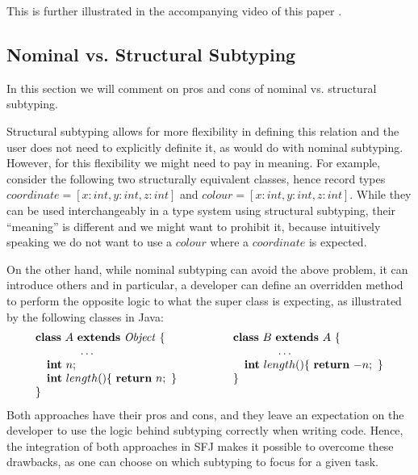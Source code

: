 \documentclass[runningheads]{llncs}
\begin{document}
This is further illustrated in the accompanying video of this paper \cite{UD20}.

\subsection{Nominal vs. Structural Subtyping}
\label{sec:nominal}
In this section we will comment on pros and cons of nominal vs. structural subtyping.

Structural subtyping allows for more flexibility in defining this relation and the user does not need to explicitly definite it, as would do with nominal subtyping.
However, for this flexibility we might need to pay in meaning.
For example, consider the following two structurally equivalent classes, hence record types
$coordinate = [x:int, y:int, z:int]$ and $colour = [x:int, y:int, z:int]$.
While they can be used interchangeably in a type system using structural subtyping, their ``meaning'' is different and we might want to prohibit it, because intuitively speaking we do not want to use a $colour$ where a $coordinate$ is expected.

On the other hand, while nominal subtyping can avoid the above problem, it can introduce others and in particular, a developer can define an overridden method to perform the opposite logic to what the super class is expecting, as illustrated by the following classes in Java:
\begin{equation*}
    \begin{array}{ll}
        \mathbf{class} \  A \ \mathbf{extends }\  \mathit{Object}\ \{
         &
            \qquad
            \mathbf{class} \  B \ \mathbf{extends }\  A\ \{
                \\
               \qquad \qquad\ldots \qquad
         &
                \qquad\qquad\qquad \ldots
                \\
                \quad \textbf{int}\ n;\qquad
         &
                \qquad\quad \textbf{int}\ length()\{\ \mathbf{return}\ {-n};\ \}
                \\
                \quad \textbf{int}\ length()\{\ \mathbf{return}\ {n};\ \}\qquad
         &
                \qquad\}
                \\   \}
    \end{array}
\end{equation*}
Both approaches have their pros and cons, and they leave an expectation on the developer to use the logic behind subtyping correctly when writing code. Hence, the integration of both approaches in SFJ makes it possible to  overcome these drawbacks, as one can choose on which subtyping to focus for a given task.
\end{document}
